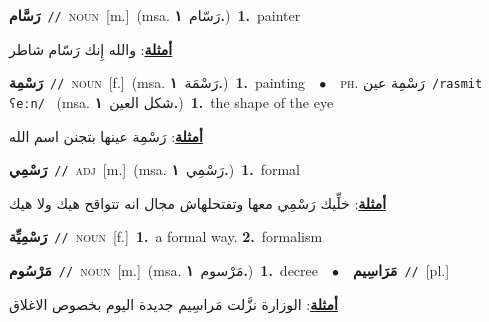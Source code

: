 \documentclass[10pt,a4paper,twoside]{article} %
\begin{document}
\begin{multicols}{2}
{\setlength\topsep{0pt}\textbf{\foreignlanguage{arabic}{رَسَّام}}\ {\color{gray}\texttt{//}\color{black}}\ \textsc{noun}\ [m.]\ \color{gray}(msa. \foreignlanguage{arabic}{رَسّام}~\foreignlanguage{arabic}{\textbf{١.}})\color{black}\ \textbf{1.}~painter\  \begin{flushright}\color{gray}\foreignlanguage{arabic}{\textbf{\underline{\foreignlanguage{arabic}{أمثلة}}}: والله إِنك رَسّام شاطر}\end{flushright}\color{black}} \vspace{2mm}

{\setlength\topsep{0pt}\textbf{\foreignlanguage{arabic}{رَسْمِة}}\ {\color{gray}\texttt{//}\color{black}}\ \textsc{noun}\ [f.]\ \color{gray}(msa. \foreignlanguage{arabic}{رَسْمَة}~\foreignlanguage{arabic}{\textbf{١.}})\color{black}\ \textbf{1.}~painting\ \ $\bullet$\ \ \textsc{ph.} \color{gray} \foreignlanguage{arabic}{رَسْمِة عين}\color{black}\ {\color{gray}\texttt{/{\sffamily rasmit ʕeːn}/}\color{black}}\ \color{gray} (msa. \foreignlanguage{arabic}{شكل العين}~\foreignlanguage{arabic}{\textbf{١.}})\color{black}\ \textbf{1.}~the shape of the eye\  \begin{flushright}\color{gray}\foreignlanguage{arabic}{\textbf{\underline{\foreignlanguage{arabic}{أمثلة}}}: رَسْمِة عينها بتجنن اسم الله}\end{flushright}\color{black}} \vspace{2mm}

{\setlength\topsep{0pt}\textbf{\foreignlanguage{arabic}{رَسْمِي}}\ {\color{gray}\texttt{//}\color{black}}\ \textsc{adj}\ [m.]\ \color{gray}(msa. \foreignlanguage{arabic}{رَسْمِي}~\foreignlanguage{arabic}{\textbf{١.}})\color{black}\ \textbf{1.}~formal\  \begin{flushright}\color{gray}\foreignlanguage{arabic}{\textbf{\underline{\foreignlanguage{arabic}{أمثلة}}}: خلِّيك رَسْمِي معها وتفتحلهاش مجال انه تتواقح هيك ولا هيك}\end{flushright}\color{black}} \vspace{2mm}

{\setlength\topsep{0pt}\textbf{\foreignlanguage{arabic}{رَسْمِيِّة}}\ {\color{gray}\texttt{//}\color{black}}\ \textsc{noun}\ [f.]\ \textbf{1.}~a formal way.  \textbf{2.}~formalism\ } \vspace{2mm}

{\setlength\topsep{0pt}\textbf{\foreignlanguage{arabic}{مَرْسُوم}}\ {\color{gray}\texttt{//}\color{black}}\ \textsc{noun}\ [m.]\ \color{gray}(msa. \foreignlanguage{arabic}{مَرْسوم}~\foreignlanguage{arabic}{\textbf{١.}})\color{black}\ \textbf{1.}~decree\ \ $\bullet$\ \ \setlength\topsep{0pt}\textbf{\foreignlanguage{arabic}{مَرَاسِيم}}\ {\color{gray}\texttt{//}\color{black}}\ [pl.]\  \begin{flushright}\color{gray}\foreignlanguage{arabic}{\textbf{\underline{\foreignlanguage{arabic}{أمثلة}}}: الوزارة نزَّلت مَراسِيم جديدة اليوم بخصوص الاغلاق}\end{flushright}\color{black}} \vspace{2mm}


\end{multicols}
\end{document}
